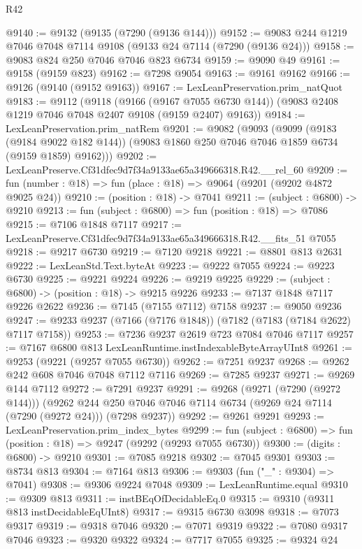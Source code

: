 \begin{lexlean}{R42}
\begin{coremodule}
{@9140 := @9132 (@9135 (@7290 (@9136 @144)))
@9152 := @9083 @244 @1219 @7046 @7048 @7114 @9108 (@9133 @24 @7114 (@7290 (@9136 @24)))
@9158 := @9083 @824 @250 @7046 @7046 @823 @6734
@9159 := @9090 @49
@9161 := @9158 (@9159 @823)
@9162 := @7298 @9054
@9163 := @9161 @9162
@9166 := @9126 (@9140 (@9152 @9163))
@9167 := LexLeanPreservation.prim_natQuot
@9183 := @9112
    (@9118
      (@9166 (@9167 @7055 @6730 @144))
      (@9083 @2408 @1219 @7046 @7048 @2407 @9108 (@9159 @2407) @9163))
@9184 := LexLeanPreservation.prim_natRem
@9201 := @9082
    (@9093
      (@9099
        (@9183 (@9184 @9022 @182 @144))
        (@9083 @1860 @250 @7046 @7046 @1859 @6734 (@9159 @1859) @9162)))
@9202 := LexLeanPreserve.Cf31dfec9d7f34a9133ae65a349666318.R42.__rel_60
@9209 := fun (number : @18) => fun (place : @18) => @9064 (@9201 (@9202 @4872 @9025 @24))
@9210 := (position : @18) -> @7041
@9211 := (subject : @6800) -> @9210
@9213 := fun (subject : @6800) => fun (position : @18) => @7086
@9215 := @7106 @1848 @7117
@9217 := LexLeanPreserve.Cf31dfec9d7f34a9133ae65a349666318.R42.__fits_51 @7055
@9218 := @9217 @6730
@9219 := @7120 @9218
@9221 := @8801 @813 @2631
@9222 := LexLeanStd.Text.byteAt
@9223 := @9222 @7055
@9224 := @9223 @6730
@9225 := @9221 @9224
@9226 := @9219 @9225
@9229 := (subject : @6800) -> (position : @18) -> @9215 @9226
@9233 := @7137 @1848 @7117 @9226 @2622
@9236 := @7145 (@7155 @7112) @7158
@9237 := @9050 @9236
@9247 := @9233 @9237 (@7166 (@7176 @1848)) (@7182 (@7183 (@7184 @2622) @7117 @7158))
@9253 := @7236 @9237 @2619 @723 @7084 @7046 @7117
@9257 := @7167 @6800 @813 LexLeanRuntime.instIndexableByteArrayUInt8
@9261 := @9253 (@9221 (@9257 @7055 @6730))
@9262 := @7251 @9237
@9268 := @9262 @242 @608 @7046 @7048 @7112 @7116
@9269 := @7285 @9237
@9271 := @9269 @144 @7112
@9272 := @7291 @9237
@9291 := @9268
    (@9271 (@7290 (@9272 @144)))
    (@9262 @244 @250 @7046 @7046 @7114 @6734 (@9269 @24 @7114 (@7290 (@9272 @24))) (@7298 @9237))
@9292 := @9261 @9291
@9293 := LexLeanPreservation.prim_index_bytes
@9299 := fun (subject : @6800) => fun (position : @18) => @9247 (@9292 (@9293 @7055 @6730))
@9300 := (digits : @6800) -> @9210
@9301 := @7085 @9218
@9302 := @7045 @9301
@9303 := @8734 @813
@9304 := @7164 @813
@9306 := @9303 (fun ("_" : @9304) => @7041)
@9308 := @9306 @9224 @7048
@9309 := LexLeanRuntime.equal
@9310 := @9309 @813
@9311 := instBEqOfDecidableEq.{0}
@9315 := @9310 (@9311 @813 instDecidableEqUInt8)
@9317 := @9315 @6730 @3098
@9318 := @7073 @9317
@9319 := @9318 @7046
@9320 := @7071 @9319
@9322 := @7080 @9317 @7046
@9323 := @9320 @9322
@9324 := @7717 @7055
@9325 := @9324 @24
}
\end{coremodule}
\end{lexlean}
